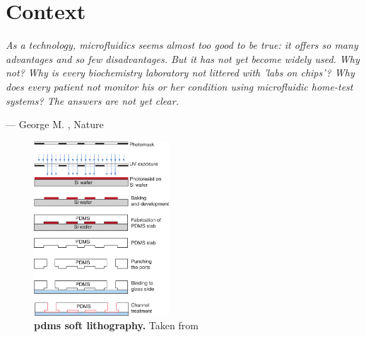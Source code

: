 \chapter*{Context}

\setlength\epigraphwidth{\textwidth}
\setlength\epigraphrule{0pt}
\epigraph{\justifying\textit{As a technology, microfluidics seems almost too good to be true: it offers so many advantages and so few disadvantages. But it has not yet become widely used. Why not? Why is every biochemistry laboratory not littered with 'labs on chips'? Why does every patient not monitor his or her condition using microfluidic home-test systems? The answers are not yet clear.}}{--- George M. \citeauthor{whitesides2006}, Nature \citeyear{whitesides2006}}

\begin{figure}
\centering
\includegraphics[width=0.45\textwidth]{./ims/mazutis2013.png}
\caption[PDMS soft lithography]{\textbf{\acrshort{pdms} soft lithography.} Taken from \cite{mazutis2013}}
\label{fig:mazutis2013}
\vspace{-20pt}
\end{figure}

